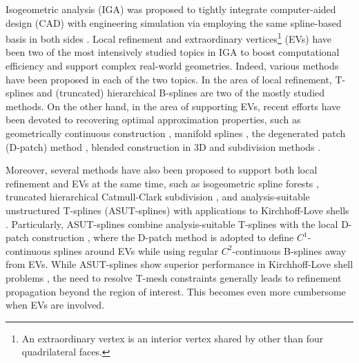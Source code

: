 \documentclass[graybox]{svmult}
\begin{document}
Isogeometric analysis (IGA) was proposed to tightly integrate computer-aided design (CAD) with engineering simulation via employing the same spline-based basis in both sides \cite{ref:hughes05, ref:cottrell09}. Local refinement and extraordinary vertices\footnote{An extraordinary vertex is an interior vertex shared by other than four quadrilateral faces.} (EVs) have been two of the most intensively studied topics in IGA to boost computational efficiency and support complex real-world geometries. Indeed, various methods have been proposed in each of the two topics. In the area of local refinement, T-splines \cite{ref:sederberg03, ref:sederberg04, ref:bazilevs10} and (truncated) hierarchical B-splines \cite{ref:forsey88, ref:kraft97, ref:vuong11, ref:giannelli12} are two of the mostly studied methods. On the other hand, in the area of supporting EVs, recent efforts have been devoted to recovering optimal approximation properties, such as geometrically continuous construction \cite{ref:kapl15}, manifold splines \cite{ref:majeed17, ref:bercovier17}, the degenerated patch (D-patch) method \cite{ref:reif97, ref:tnguyen16, ref:toshniwal17}, blended construction in 3D \cite{ref:wei18} and subdivision methods \cite{ref:xli19, ref:wei20}. 

Moreover, several methods have also been proposed to support both local refinement and EVs at the same time, such as isogeometric spline forests \cite{ref:scott14}, truncated hierarchical Catmull-Clark subdivision \cite{ref:wei15a, ref:wei15b}, and analysis-suitable unstructured T-splines (ASUT-splines) with applications to Kirchhoff-Love shells \cite{ref:casquero20}. Particularly, ASUT-splines combine analysis-suitable T-splines \cite{ref:scott12, ref:veiga12, ref:li14} with the local D-patch construction \cite{ref:toshniwal17}, where the D-patch method is adopted to define $C^1$-continuous splines around EVs while using regular $C^2$-continuous B-splines away from EVs. While ASUT-splines show superior performance in Kirchhoff-Love shell problems \cite{ref:casquero20}, the need to resolve T-mesh constraints generally leads to refinement propagation beyond the region of interest. This becomes even more cumbersome when EVs are involved.
\end{document}
